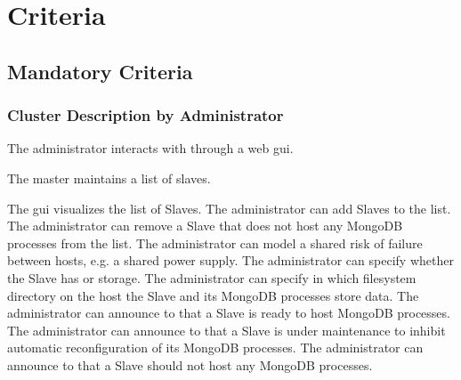 \section{Criteria}
\subsection{Mandatory Criteria}
\subsubsection{Cluster Description by Administrator}
\begin{description}
	
	 The administrator interacts with \mamid through a web gui. \done
	
	 The master maintains a list of slaves. \done
	\begin{description}
		 The gui visualizes the list of Slaves. \done
		 The administrator can add Slaves to the list. \done
		 The administrator can remove a Slave that does not host any MongoDB processes from the 
		list. \done
		 The administrator can model a shared risk of failure between hosts, e.g. a shared power 
		supply. \done
		 The administrator can specify whether the Slave has  or  storage. \done
		 The administrator can specify in which filesystem directory on the host the Slave 
		and its MongoDB processes store data. %
		 The administrator can announce to \mamid that a Slave is ready to host MongoDB processes. 
		\done
		 The administrator can announce to \mamid that a Slave is under maintenance to inhibit 
		automatic reconfiguration of its MongoDB processes. \done %
		 The administrator can announce to \mamid that a Slave should not host any MongoDB processes. 
		\done
	\end{description}
	

\end{description}
